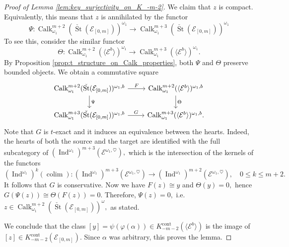 \documentclass[11pt,leqno]{amsart}
\numberwithin{equation}{section}
\DeclareMathOperator*{\colim}{colim}
\newcommand{\cont}{\operatorname{cont}}
\newcommand{\St}{\operatorname{St}}
\newcommand{\cE}{{\mathcal E}}
\newcommand{\la}{\langle}
\newcommand{\ra}{\rangle}
\newcommand{\Ind}{\operatorname{Ind}}
\newcommand{\Calk}{\operatorname{Calk}}
\begin{document}
\begin{proof}[Proof of Lemma \ref{lem:key_surjectivity_on_K_-m-2}]
We claim that $z$ is compact. Equivalently, this means that $z$ is annihilated by the functor
\begin{equation*}
\Psi:\Calk_{\omega_1}^{m+2}(\check{\St}(\cE_{[0,m]}))^{\omega_1}\to \Calk_{\omega_1}^{m+3}(\check{\St}(\cE_{[0,m]}))^{\omega_1}
\end{equation*}
To see this, consider the similar functor
\begin{equation*}
\Theta:\Calk_{\omega_1}^{m+2}(\la \cE^b\ra)^{\omega_1}\to \Calk_{\omega_1}^{m+3}(\la \cE^b\ra)^{\omega_1}.
\end{equation*}
By Proposition \ref{prop:t_structure_on_Calk_properties}, both $\Psi$ and $\Theta$ preserve bounded objects. We obtain a commutative square
\begin{equation*}
\begin{tikzcd}
\Calk_{\omega_1}^{m+2}(\check{\St}(\cE_{[0,m]}))^{\omega_1,b} \ar[d, "\Psi"]\ar[r, "F"] & \Calk_{\omega_1}^{m+2}(\la\cE^b\ra)^{\omega_1,b}\ar[d, "\Theta"]\\
\Calk_{\omega_1}^{m+3}(\check{\St}(\cE_{[0,m]}))^{\omega_1,b}\ar[r, "G"] & \Calk_{\omega_1}^{m+3}(\la\cE^b\ra)^{\omega_1,b}.
\end{tikzcd}
\end{equation*}
Note that $G$ is $t$-exact and it induces an equivalence between the hearts. Indeed, the hearts of both the source and the target are identified with the full subcategory of $(\Ind^{\omega_1})^{m+3}(\cE^{\omega_1,\heartsuit}),$ which is the intersection of the kernels of the functors
\begin{equation*}
(\Ind^{\omega_1})^k(\colim):(\Ind^{\omega_1})^{m+3}(\cE^{\omega_1,\heartsuit})\to (\Ind^{\omega_1})^{m+2}(\cE^{\omega_1,\heartsuit}),\quad 0\leq k\leq m+2.
\end{equation*}
It follows that $G$ is conservative. Now we have $F(z)\cong y$ and $\Theta(y)=0,$ hence $G(\Psi(z))\cong\Theta(F(z))=0.$ Therefore, $\Psi(z)=0,$ i.e. $z\in\Calk_{\omega_1}^{m+2}(\check{\St}(\cE_{[0,m]}))^{\omega},$ as stated.

We conclude that the class $[y]=\psi(\varphi(\alpha))\in K_{-m-2}^{\cont}(\la \cE^b\ra)$ is the image of $[z]\in K_{-m-2}^{\cont}(\cE_{[0,m]}).$ Since $\alpha$ was arbitrary, this proves the lemma.
\end{proof}
\end{document}
